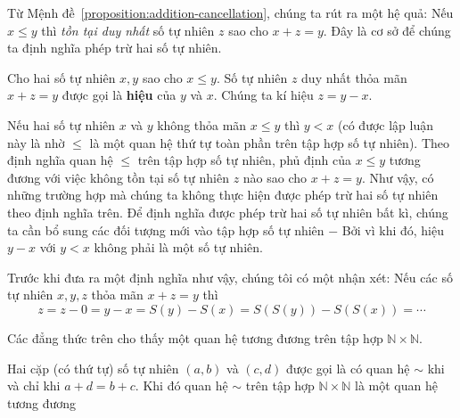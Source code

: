 Từ Mệnh đề~\ref{proposition:addition-cancellation}, chúng ta rút ra một hệ quả: Nếu $x\leq y$ thì \textit{tồn tại duy nhất} số tự nhiên $z$ sao cho $x + z = y$. Đây là cơ sở để chúng ta định nghĩa phép trừ hai số tự nhiên.

\begin{definition}
	Cho hai số tự nhiên $x, y$ sao cho $x\leq y$. Số tự nhiên $z$ duy nhất thỏa mãn $x + z = y$ được gọi là \textbf{hiệu} của $y$ và $x$. Chúng ta kí hiệu $z = y - x$.
\end{definition}

Nếu hai số tự nhiên $x$ và $y$ không thỏa mãn $x\leq y$ thì $y < x$ (có được lập luận này là nhờ $\leq$ là một quan hệ thứ tự toàn phần trên tập hợp số tự nhiên). Theo định nghĩa quan hệ $\leq$ trên tập hợp số tự nhiên, phủ định của $x\leq y$ tương đương với việc không tồn tại số tự nhiên $z$ nào sao cho $x + z = y$. Như vậy, có những trường hợp mà chúng ta không thực hiện được phép trừ hai số tự nhiên theo định nghĩa trên. Để định nghĩa được phép trừ hai số tự nhiên bất kì, chúng ta cần bổ sung các đối tượng mới vào tập hợp số tự nhiên $-$ Bởi vì khi đó, hiệu $y - x$ với $y < x$ không phải là một số tự nhiên.

Trước khi đưa ra một định nghĩa như vậy, chúng tôi có một nhận xét: Nếu các số tự nhiên $x, y, z$ thỏa mãn $x + z = y$ thì
\[
	z = z - 0 = y - x = S(y) - S(x) = S(S(y)) - S(S(x)) = \cdots
\]

Các đẳng thức trên cho thấy một quan hệ tương đương trên tập hợp $\mathbb{N}\times\mathbb{N}$.
\begin{theorem}
	Hai cặp (có thứ tự) số tự nhiên $(a, b)$ và $(c, d)$ được gọi là có quan hệ $\sim$ khi và chỉ khi $a + d = b + c$. Khi đó quan hệ $\sim$ trên tập hợp $\mathbb{N}\times\mathbb{N}$ là một quan hệ tương đương
\end{theorem}

